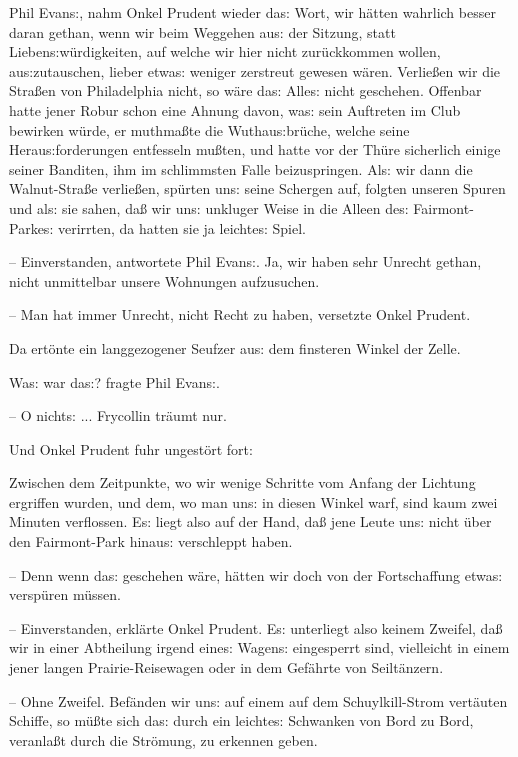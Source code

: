 \documentclass[oneside,12pt]{book}
\newcommand{\s}{s:}
\begin{document}
{\glqq}Phil Evan{\s}, nahm Onkel Prudent wieder da{\s} Wort, wir
h\"atten wahrlich besser daran gethan, wenn wir beim Weggehen au{\s}
der Sitzung, statt Lieben{\s}w\"urdigkeiten, auf welche wir hier
nicht zur\"uckkommen wollen, au{\s}zutauschen, lieber etwa{\s}
weniger zerstreut gewesen w\"aren. Verlie{\ss}en wir die Stra{\ss}en
von Philadelphia nicht, so w\"are da{\s} Alle{\s} nicht geschehen.
Offenbar hatte jener Robur schon eine Ahnung davon, wa{\s} sein
Auftreten im Club bewirken w\"urde, er muthma{\ss}te die
Wuthau{\s}br\"uche, welche seine Herau{\s}forderungen entfesseln
mu{\ss}ten, und hatte vor der Th\"ure sicherlich einige seiner
Banditen, ihm im schlimmsten Falle beizuspringen. Al{\s} wir dann die
Walnut-Stra{\ss}e verlie{\ss}en, sp\"urten un{\s} seine Schergen auf,
folgten unseren Spuren und al{\s} sie sahen, da{\ss} wir un{\s}
unkluger Weise in die Alleen de{\s} Fairmont-Parke{\s} verirrten, da
hatten sie ja leichte{\s} Spiel.

-- Einverstanden, antwortete Phil Evan{\s}. Ja, wir haben sehr
Unrecht gethan, nicht unmittelbar unsere Wohnungen aufzusuchen.

-- Man hat immer Unrecht, nicht Recht zu haben,{\grqq} versetzte
Onkel Prudent.

Da ert\"onte ein langgezogener Seufzer au{\s} dem finsteren Winkel
der Zelle.

{\glqq}Wa{\s} war da{\s}? fragte Phil Evan{\s}.

-- O nicht{\s} ... Frycollin tr\"aumt nur.{\grqq}

Und Onkel Prudent fuhr ungest\"ort fort:

{\glqq}Zwischen dem Zeitpunkte, wo wir wenige Schritte vom Anfang der
Lichtung ergriffen wurden, und dem, wo man un{\s} in diesen Winkel
warf, sind kaum zwei Minuten verflossen. E{\s} liegt also auf der
Hand, da{\ss} jene Leute un{\s} nicht \"uber den Fairmont-Park
hinau{\s} verschleppt haben.

-- Denn wenn da{\s} geschehen w\"are, h\"atten wir doch von der
Fortschaffung etwa{\s} versp\"uren m\"ussen.

-- Einverstanden, erkl\"arte Onkel Prudent. E{\s} unterliegt also
keinem Zweifel, da{\ss} wir in einer Abtheilung irgend eine{\s}
Wagen{\s} eingesperrt sind, vielleicht in einem jener langen
Prairie-Reisewagen oder in dem Gef\"ahrte von Seilt\"anzern.

-- Ohne Zweifel. Bef\"anden wir un{\s} auf einem auf dem
Schuylkill-Strom vert\"auten Schiffe, so m\"u{\ss}te sich da{\s}
durch ein leichte{\s} Schwanken von Bord zu Bord, veranla{\ss}t durch
die Str\"omung, zu erkennen geben.
\end{document}

